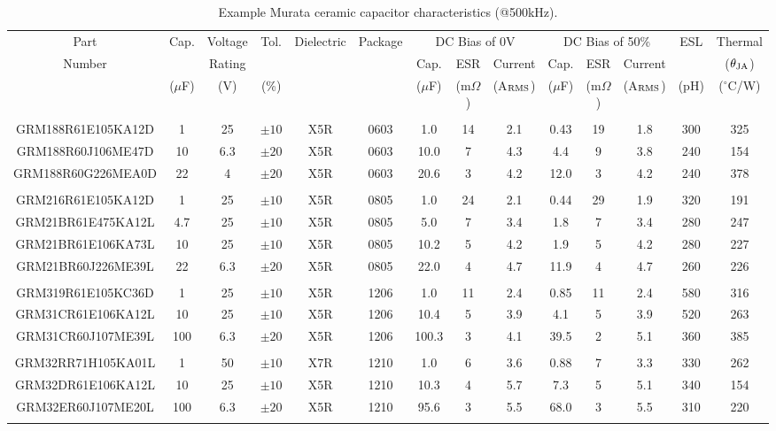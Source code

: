 \documentclass[10pt,twoside]{article}
\begin{document}
\begin{landscape}
\begin{table}[p]
\small
\caption{Example Murata ceramic capacitor characteristics (@500kHz).}
\label{tab:murata_caps}
\begin{center}
\begin{tabular}{|c|c|c|c|c|c||c|c|c||c|c|c||c|c|}
\hline
Part   & Cap. & Voltage & Tol. & Dielectric & Package &
\multicolumn{3}{c||}{DC Bias of 0V}  &
\multicolumn{3}{c||}{DC Bias of 50\%} & ESL & Thermal\\
%
\cline{7-12}
Number &   & Rating  &           &            &         &
Cap. & ESR & Current    &
Cap. & ESR & Current    &       & ($\theta_{\rm JA}$)\\
%
       & ($\mu$F) & (V) & (\%) & & & 
($\mu$F) & (m$\Omega$) & (A$_{\rm RMS}$) &
($\mu$F) & (m$\Omega$) & (A$_{\rm RMS}$) & (pH) & ($^\circ$C/W)\\
\hline\hline
&&&&&&&&&&&&&\\
GRM188R61E105KA12D &    1 &  25 & $\pm10$ & X5R & 0603 &   1.0 & 14 & 2.1 & 0.43 & 19 & 1.8 & 300 & 325\\
GRM188R60J106ME47D &   10 & 6.3 & $\pm20$ & X5R & 0603 &  10.0 &  7 & 4.3 & 4.4  &  9 & 3.8 & 240 & 154\\
GRM188R60G226MEA0D &   22 &   4 & $\pm20$ & X5R & 0603 &  20.6 &  3 & 4.2 & 12.0 &  3 & 4.2 & 240 & 378\\
&&&&&&&&&&&&&\\
GRM216R61E105KA12D &    1 &  25 & $\pm10$ & X5R & 0805 &   1.0 & 24 & 2.1 & 0.44 & 29 & 1.9 & 320 & 191\\
GRM21BR61E475KA12L &  4.7 &  25 & $\pm10$ & X5R & 0805 &   5.0 &  7 & 3.4 & 1.8  &  7 & 3.4 & 280 & 247\\
GRM21BR61E106KA73L &   10 &  25 & $\pm10$ & X5R & 0805 &  10.2 &  5 & 4.2 & 1.9  &  5 & 4.2 & 280 & 227\\
GRM21BR60J226ME39L &   22 & 6.3 & $\pm20$ & X5R & 0805 &  22.0 &  4 & 4.7 & 11.9 &  4 & 4.7 & 260 & 226\\
&&&&&&&&&&&&&\\
GRM319R61E105KC36D &    1 &  25 & $\pm10$ & X5R & 1206 &   1.0 & 11 & 2.4 & 0.85 & 11 & 2.4 & 580 & 316\\
GRM31CR61E106KA12L &   10 &  25 & $\pm10$ & X5R & 1206 &  10.4 &  5 & 3.9 & 4.1  &  5 & 3.9 & 520 & 263\\
GRM31CR60J107ME39L &  100 & 6.3 & $\pm20$ & X5R & 1206 & 100.3 &  3 & 4.1 & 39.5 &  2 & 5.1 & 360 & 385\\
&&&&&&&&&&&&&\\
GRM32RR71H105KA01L &    1 &  50 & $\pm10$ & X7R & 1210 &   1.0 &  6 & 3.6 & 0.88 &  7 & 3.3 & 330 & 262\\
GRM32DR61E106KA12L &   10 &  25 & $\pm10$ & X5R & 1210 &  10.3 &  4 & 5.7 & 7.3  &  5 & 5.1 & 340 & 154\\
GRM32ER60J107ME20L &  100 & 6.3 & $\pm20$ & X5R & 1210 &  95.6 &  3 & 5.5 & 68.0 &  3 & 5.5 & 310 & 220\\
&&&&&&&&&&&&&\\
\hline
\end{tabular}
\end{center}
\end{table}
\end{landscape}
\end{document}
